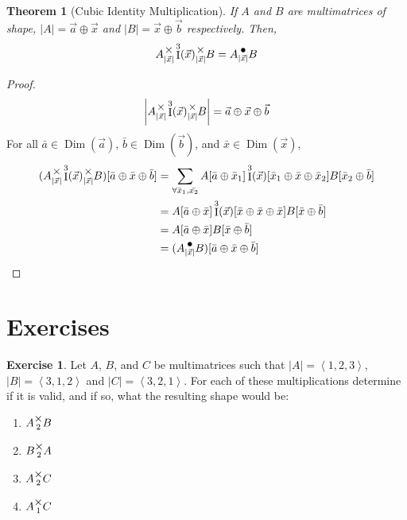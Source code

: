 \documentclass[12pt]{book}
\theoremstyle{plain}
\newtheorem{theorem}{Theorem}[chapter]
\theoremstyle{definition}
\newtheorem{exercise}{Exercise}[chapter]
\theoremstyle{ppart}
\theoremstyle{case}
\theoremstyle{solution}
\DeclareMathOperator{\Dim}{Dim}
\DeclareMathOperator{\Ident}{I}
\newcommand{\mmult}[1]{\text{\raisebox{1ex}{$\underset{#1}{\times}$}}}
\newcommand{\dmult}[1]{\text{\raisebox{1ex}{$\underset{#1}{\,\bullet\,}$}}}
\newcommand{\shape}[1]{\left|#1\right|}
\begin{document}
\begin{theorem}[Cubic Identity Multiplication]
\label{hada_cubic}
If $A$ and $B$ are multimatrices of shape, $\shape{A} = \vec{a} \oplus \vec{x}$
and $\shape{B} = \vec{x} \oplus \vec{b}$ respectively. Then,
\[ A \mmult{\shape{\vec{x}}} \Ident^3(\vec{x}) \mmult{\shape{\vec{x}}} B = A \dmult{\shape{\vec{x}}} B \]
\end{theorem}
\begin{proof}
\[ \shape{A \mmult{\shape{\vec{x}}} \Ident^3(\vec{x}) \mmult{\shape{\vec{x}}} B} = \vec{a} \oplus \vec{x} \oplus \vec{b}  \]
For all $\bar{a} \in \Dim(\vec{a})$, $\bar{b} \in \Dim(\vec{b})$, and $\bar{x} \in \Dim(\vec{x})$, 
\begin{align*}
  (A \mmult{\shape{\vec{x}}} \Ident^3(\vec{x}) \mmult{\shape{\vec{x}}} B)[\bar{a} \oplus \bar{x} \oplus \bar{b}]
  &= \sum_{\forall \bar{x}_1, \bar{x_2}} A[\bar{a} \oplus \bar{x}_1] \Ident^3(\vec{x})[\bar{x}_1 \oplus \bar{x} \oplus \bar{x}_2] B[\bar{x}_2 \oplus \bar{b}] \\
  &= A[\bar{a} \oplus \bar{x}] \Ident^3(\vec{x})[\bar{x} \oplus \bar{x} \oplus \bar{x}] B[\bar{x} \oplus \bar{b}] \\
  &= A[\bar{a} \oplus \bar{x}] B[\bar{x} \oplus \bar{b}] \\
  &= (A \dmult{\shape{\vec{x}}} B) [\bar{a} \oplus \bar{x} \oplus \bar{b}]
\end{align*}
\end{proof}

\section{Exercises}

\begin{exercise}
Let $A$, $B$, and $C$ be multimatrices such that $\shape{A} = \left<1,2,3\right>$,
$\shape{B} = \left<3,1,2\right>$ and $\shape{C} = \left<3,2,1\right>$. For each of these
multiplications determine if it is valid, and if so, what the resulting
shape would be:
\begin{enumerate}
\item $A \mmult{2} B$
\item $B \mmult{2} A$
\item $A \mmult{2} C$
\item $A \mmult{1} C$
\end{enumerate}
\end{exercise}
\end{document}
